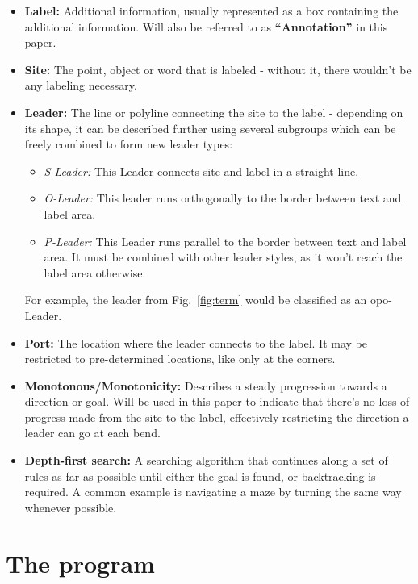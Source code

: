 \documentclass[11pt,a4paper]{article}
\begin{document}
\begin{itemize}
 \item \textbf{Label:} Additional information, usually represented as a box containing the additional information. Will also be referred to as \textbf{``Annotation''} in this paper.
 \item \textbf{Site:} The point, object or word that is labeled - without it, there wouldn't be any labeling necessary.
 \item \textbf{Leader:} The line or polyline connecting the site to the label - depending on its shape, it can be described further using several subgroups which can be freely combined to form new leader types:
  \begin{itemize}
   \item \textit{S-Leader:} This Leader connects site and label in a straight line.
   \item \textit{O-Leader:} This leader runs orthogonally to the border between text and label area.
   \item \textit{P-Leader:} This Leader runs parallel to the border between text and label area. It must be combined with other leader styles, as it won't reach the label area otherwise.
  \end{itemize}
    For example, the leader from Fig.~\ref{fig:term} would be classified as an opo-Leader.
 \item \textbf{Port:} The location where the leader connects to the label. It may be restricted to pre-determined locations, like only at the corners.
  \item \textbf{Monotonous/Monotonicity:} Describes a steady progression towards a direction or goal. Will be used in this paper to indicate that there's no loss of progress made from the site to the label, effectively restricting the direction a leader can go at each bend.
  \item \textbf{Depth-first search:} A searching algorithm that continues along a set of rules as far as possible until either the goal is found, or backtracking is required. A common example is navigating a maze by turning the same way whenever possible.
\end{itemize}

\section{The program}
\end{document}
